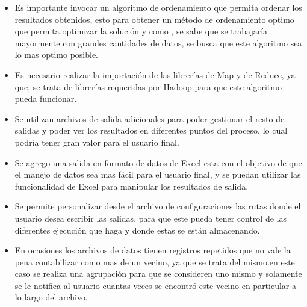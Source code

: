 \begin{itemize}
	\item Es importante invocar un algoritmo de ordenamiento que permita ordenar los resultados obtenidos, esto para obtener un método de ordenamiento optimo que permita optimizar la solución y como , se sabe que se trabajaría mayormente con grandes cantidades de datos, se busca que este algoritmo sea lo mas optimo posible.
	\item Es necesario realizar la importación de las librerías de Map y de Reduce, ya que, se trata de librerías requeridas por Hadoop para que este algoritmo pueda funcionar.
	\item Se utilizan archivos de salida adicionales para poder gestionar el resto de salidas y poder ver los resultados en diferentes puntos del proceso, lo cual podría tener gran valor para el usuario final. 
	\item Se agrego una salida en formato de datos de Excel esta con el objetivo de que el manejo de datos sea mas fácil para el usuario final, y se puedan utilizar las funcionalidad de Excel para manipular los resultados de salida.  
	\item Se permite personalizar desde el archivo de configuraciones las rutas donde el usuario desea escribir las salidas, para que este pueda tener control de las diferentes ejecución que haga y donde estas se están almacenando.
	\\
	\item En ocasiones los archivos de datos tienen registros repetidos que no vale la pena contabilizar como mas de un vecino, ya que se trata del mismo.en este caso se realiza una agrupación para que se consideren uno mismo y solamente se le notifica al usuario cuantas veces se encontró este vecino en particular a lo largo del archivo. 
\end{itemize}

